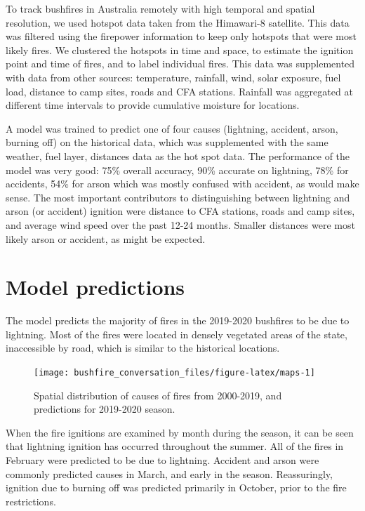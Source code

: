 \documentclass[
  11pt,
  a4paper,
]{article}
\begin{document}
To track bushfires in Australia remotely with high temporal and spatial resolution, we used hotspot data taken from the Himawari-8 satellite. This data was filtered using the firepower information to keep only hotspots that were most likely fires. We clustered the hotspots in time and space, to estimate the ignition point and time of fires, and to label individual fires. This data was supplemented with data from other sources: temperature, rainfall, wind, solar exposure, fuel load, distance to camp sites, roads and CFA stations. Rainfall was aggregated at different time intervals to provide cumulative moisture for locations.

A model was trained to predict one of four causes (lightning, accident, arson, burning off) on the historical data, which was supplemented with the same weather, fuel layer, distances data as the hot spot data. The performance of the model was very good: 75\% overall accuracy, 90\% accurate on lightning, 78\% for accidents, 54\% for arson which was mostly confused with accident, as would make sense. The most important contributors to distinguishing between lightning and arson (or accident) ignition were distance to CFA stations, roads and camp sites, and average wind speed over the past 12-24 months. Smaller distances were most likely arson or accident, as might be expected.

\hypertarget{models}{%
\section{Model predictions}\label{models}}

The model predicts the majority of fires in the 2019-2020 bushfires to be due to lightning. Most of the fires were located in densely vegetated areas of the state, inaccessible by road, which is similar to the historical locations.

\begin{figure}[H]

{\centering \texttt{[image: bushfire\_conversation\_files/figure-latex/maps-1]} 

}

\caption{Spatial distribution of causes of fires from 2000-2019, and predictions for 2019-2020 season.}\label{fig:maps}
\end{figure}

When the fire ignitions are examined by month during the season, it can be seen that lightning ignition has occurred throughout the summer. All of the fires in February were predicted to be due to lightning. Accident and arson were commonly predicted causes in March, and early in the season. Reassuringly, ignition due to burning off was predicted primarily in October, prior to the fire restrictions.
\end{document}
